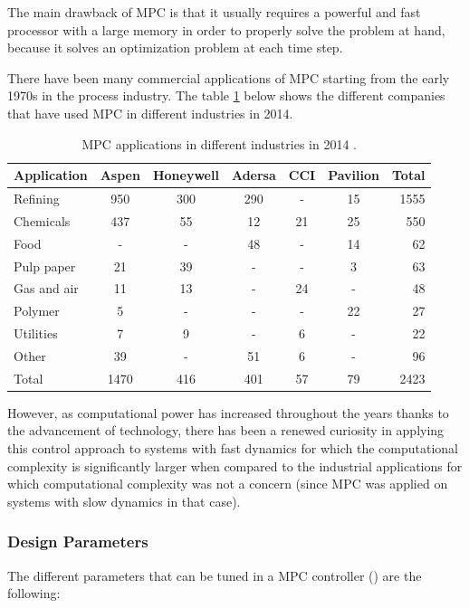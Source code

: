 \documentclass{thesisreport}
\begin{document}
\noindent The main drawback of MPC is that it usually requires a powerful and fast processor with a large memory in order to properly solve the problem at hand, because it solves an optimization problem at each time step.
 
\noindent There have been many commercial applications of MPC starting from the early 1970s in the process industry. The table \ref{table_MPC} below shows the different companies that have used MPC in different industries in 2014.
 
\newpage

\begin{table}[h]
\setlength{\tabcolsep}{15pt} %
\renewcommand{\arraystretch}{1} %
 \caption{MPC applications in different industries in 2014 \cite{Kozak2014}.}
 \label{table_MPC}
\begin{tabular}{l c c c c c r}
Application & Aspen & Honeywell & Adersa & CCI & Pavilion & Total \\
\hline
Refining & 950 & 300 & 290 & - & 15 & 1555 \\
Chemicals & 437 & 55 & 12 & 21 & 25 & 550 \\
Food & - & - & 48 & - & 14 & 62 \\
Pulp paper & 21 & 39 & - & - & 3 & 63 \\
Gas and air & 11 & 13 & - & 24 & - & 48 \\
Polymer & 5 & - & - & - & 22 & 27 \\
Utilities & 7 & 9 & - & 6 & - & 22 \\
Other & 39 & - & 51 & 6 & - & 96 \\
\hline 
\hline
Total & 1470 & 416 & 401 & 57 & 79 & 2423 \\
\end{tabular}
\end{table}

\noindent However, as computational power has increased throughout the years thanks to the advancement of technology, there has been a renewed curiosity in applying this control approach to systems with fast dynamics for which the computational complexity is significantly larger when compared to the industrial applications for which computational complexity was not a concern (since MPC was applied on systems with slow dynamics in that case).
 
\subsubsection{Design Parameters}
The different parameters that can be tuned in a MPC controller (\cite{MathWorks2018, MathWorks2018b, MathWorks2018c}) are the following:
\end{document}
